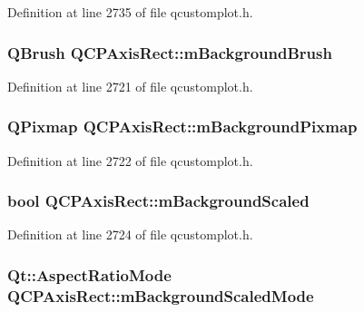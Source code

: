 Definition at line 2735 of file qcustomplot.\-h.

\hypertarget{class_q_c_p_axis_rect_a5748e1a37f63c428e38b0a7724b46259}{
\subsubsection[{m\-Background\-Brush}]{\setlength{\rightskip}{0pt plus 5cm}Q\-Brush Q\-C\-P\-Axis\-Rect\-::m\-Background\-Brush\hspace{0.3cm}{\ttfamily [protected]}}}\label{class_q_c_p_axis_rect_a5748e1a37f63c428e38b0a7724b46259}


Definition at line 2721 of file qcustomplot.\-h.

\hypertarget{class_q_c_p_axis_rect_a38fb1a15f43228a0c124553649303722}{
\subsubsection[{m\-Background\-Pixmap}]{\setlength{\rightskip}{0pt plus 5cm}Q\-Pixmap Q\-C\-P\-Axis\-Rect\-::m\-Background\-Pixmap\hspace{0.3cm}{\ttfamily [protected]}}}\label{class_q_c_p_axis_rect_a38fb1a15f43228a0c124553649303722}


Definition at line 2722 of file qcustomplot.\-h.

\hypertarget{class_q_c_p_axis_rect_a5ad835f0fae5d7cc5ada9e063641dbf1}{
\subsubsection[{m\-Background\-Scaled}]{\setlength{\rightskip}{0pt plus 5cm}bool Q\-C\-P\-Axis\-Rect\-::m\-Background\-Scaled\hspace{0.3cm}{\ttfamily [protected]}}}\label{class_q_c_p_axis_rect_a5ad835f0fae5d7cc5ada9e063641dbf1}


Definition at line 2724 of file qcustomplot.\-h.

\hypertarget{class_q_c_p_axis_rect_a859fd368e794663e346b4f53f35078e9}{
\subsubsection[{m\-Background\-Scaled\-Mode}]{\setlength{\rightskip}{0pt plus 5cm}Qt\-::\-Aspect\-Ratio\-Mode Q\-C\-P\-Axis\-Rect\-::m\-Background\-Scaled\-Mode\hspace{0.3cm}{\ttfamily [protected]}}}\label{class_q_c_p_axis_rect_a859fd368e794663e346b4f53f35078e9}


